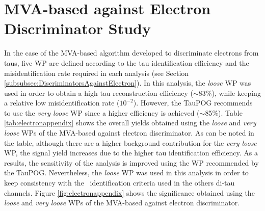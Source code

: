\section{MVA-based against Electron Discriminator Study}
\label{Results:TauID-electronDicr}

\noindent In the case of the MVA-based algorithm developed to discriminate electrons 
from taus, five WP are defined according to the tau identification efficiency and the misidentification rate 
required in each analysis (see Section \ref{subsubsec:DiscriminatorsAgainstElectron}). In this analysis, the 
\textit{loose} WP was used in order to obtain a high tau reconstruction efficiency ($\sim$83$\%$), while keeping 
a relative low misidentification rate ($10^{-2}$). However, the TauPOG recommends to use the \textit{very 
loose} WP since a higher efficiency is achieved ($\sim$85$\%$). Table \ref{tab:electronappendix} shows the overall 
yields obtained using the \textit{loose} and \textit{very loose} WPs of the MVA-based against electron discriminator. As can be noted
in the table, although there are a higher background contribution for the \textit{very loose} WP, the signal 
yield increases due to the higher tau identification efficiency. As a results, the sensitivity of the analysis
is improved using the WP recommended by the TauPOG. Nevertheless, the \textit{loose} WP was used 
in this analysis in order to keep consistency with the \tauh~identification criteria 
used in the others di-tau channels. Figure \ref{fig:electronappendix} shows 
the significance obtained using the \textit{loose} and \textit{very loose} WPs of the MVA-based against electron discriminator.


